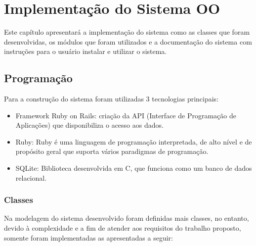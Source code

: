 

\chapter{Implementa\c{c}\~{a}o do Sistema OO}

Este capítulo apresentará a implementação do sistema como as classes que foram desenvolvidas, os módulos que foram utilizados e a documentação do sistema com instruções para o usuário instalar e utilizar o sistema.

\section{Programa\c{c}\~{a}o}
Para a construção do sistema foram utilizadas 3 tecnologias principais:
\begin{itemize}
  \item Framework Ruby on Rails: criação da API (Interface de Programação de Aplicações) que disponibiliza o acesso aos dados.
  \item Ruby: Ruby é uma linguagem de programação interpretada, de alto nível e de propósito geral que suporta vários paradigmas de programação.
  \item SQLite: Biblioteca desenvolvida em C, que funciona como um banco de dados relacional.
\end{itemize}


\subsection{Classes}

Na modelagem do sistema desenvolvido foram definidas mais classes, no entanto, devido à complexidade e a fim de atender aos requisitos do trabalho proposto, somente foram implementadas as apresentadas a seguir:


